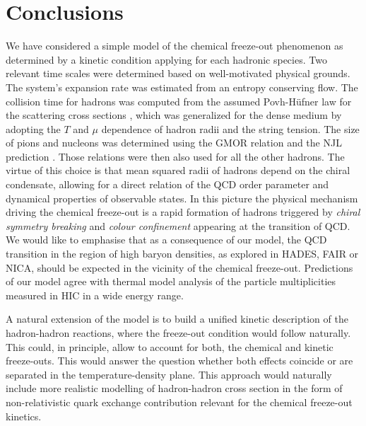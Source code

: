 \documentclass[12pt]{article}
\begin{document}

\section{Conclusions}
\label{conclusions}

We have considered a simple model of the chemical freeze-out phenomenon as determined by a kinetic condition applying for each hadronic species.
Two relevant time scales were determined based on well-motivated physical grounds.
The system's expansion rate was estimated from an entropy conserving flow.
The collision time for hadrons was computed from the assumed Povh-H{\"u}fner law
for the scattering cross sections \cite{Povh:1990ad,Hufner:1992cu}, which was generalized for the dense medium by adopting the $T$ and $\mu$ dependence of hadron radii and the string tension.
The size of pions and nucleons was determined using the GMOR relation \cite{GellMann:1968rz} and the NJL prediction \cite{Hippe:1995hu}. 
Those relations were then also used for all the other hadrons. 
The virtue of this choice is that mean squared radii of hadrons depend on the chiral condensate,
allowing for a direct relation of the QCD order parameter and dynamical properties of observable states.
In this picture the physical mechanism driving the chemical freeze-out is a rapid formation of hadrons triggered by {\it chiral symmetry breaking} and {\it colour confinement} appearing at the transition of QCD. We would like to emphasise that as a consequence of our model, the QCD transition in the region of
high baryon densities, as explored in HADES, FAIR or NICA, should be expected in the vicinity of the chemical freeze-out.
Predictions of our model agree with thermal model analysis of the particle multiplicities measured in HIC in a wide energy range.

A natural extension of the model is to build a unified kinetic description of the hadron-hadron reactions, where the freeze-out condition would follow naturally. 
This could, in principle, allow to account for both, the chemical and kinetic freeze-outs. 
This would answer the question whether both effects coincide or are separated in the temperature-density plane.
This approach would naturally include more realistic modelling of hadron-hadron cross section in the 
form of non-relativistic quark exchange contribution \cite{Martins:1994hd,Barnes:1991em} 
relevant for the chemical freeze-out kinetics. \\
\end{document}
